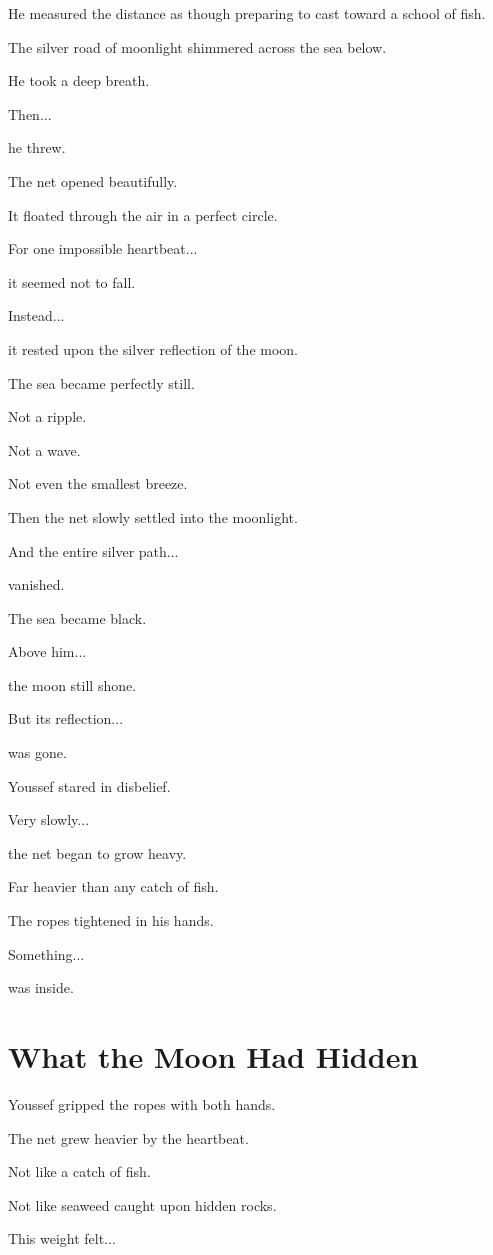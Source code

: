 \documentclass[12pt,openany]{book}
\begin{document}
He measured the distance as though preparing to cast toward a school of fish.

The silver road of moonlight shimmered across the sea below.

He took a deep breath.

Then...

he threw.

The net opened beautifully.

It floated through the air in a perfect circle.

For one impossible heartbeat...

it seemed not to fall.

Instead...

it rested upon the silver reflection of the moon.

The sea became perfectly still.

Not a ripple.

Not a wave.

Not even the smallest breeze.

Then the net slowly settled into the moonlight.

And the entire silver path...

vanished.

The sea became black.

Above him...

the moon still shone.

But its reflection...

was gone.

Youssef stared in disbelief.

Very slowly...

the net began to grow heavy.

Far heavier than any catch of fish.

The ropes tightened in his hands.

Something...

was inside.
\section*{What the Moon Had Hidden}

Youssef gripped the ropes with both hands.

The net grew heavier by the heartbeat.

Not like a catch of fish.

Not like seaweed caught upon hidden rocks.

This weight felt...
\end{document}
